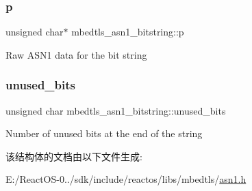 \subsubsection{\texorpdfstring{p}{p}}
{\footnotesize\ttfamily unsigned char$\ast$ mbedtls\+\_\+asn1\+\_\+bitstring\+::p}

Raw A\+S\+N1 data for the bit string \mbox{\label{structmbedtls__asn1__bitstring_aca26541c9ecb384ef2d5c2ca6a05a25b}} 
\subsubsection{\texorpdfstring{unused\+\_\+bits}{unused\_bits}}
{\footnotesize\ttfamily unsigned char mbedtls\+\_\+asn1\+\_\+bitstring\+::unused\+\_\+bits}

Number of unused bits at the end of the string 

该结构体的文档由以下文件生成\+:\begin{DoxyCompactItemize}
\item 
E\+:/\+React\+O\+S-\/0../sdk/include/reactos/libs/mbedtls/\hyperlink{asn1_8h}{asn1.\+h}\end{DoxyCompactItemize}
